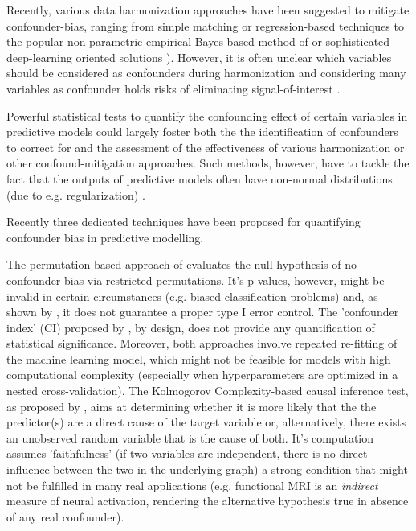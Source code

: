 \documentclass{article}
\theoremstyle{definition}
\begin{document}
Recently, various data harmonization approaches have been suggested to mitigate confounder-bias, ranging from simple matching \citep{rao2017predictive} or regression-based techniques \citep{rao2017predictive, dukart2011age, spisak2014voxel, abdulkadir2014reduction} to the popular non-parametric empirical Bayes-based method of \cite{johnson2007adjusting} or sophisticated deep-learning oriented solutions \citep{zhao2020training, hognon2019standardization}). However, it is often unclear which variables should be considered as confounders during harmonization and considering many variables as confounder holds risks of eliminating signal-of-interest \citep{wachinger2021detect}.

Powerful statistical tests to quantify the confounding effect of certain variables in predictive models could largely foster both the the identification of confounders to correct for and the assessment of the effectiveness of various harmonization or other confound-mitigation approaches. Such methods, however, have to tackle the fact that the outputs of predictive models often have non-normal distributions (due to e.g. regularization) \citep{garcia2009study, kristensen2017whole}.

Recently three dedicated techniques \citep{chaibub2019permutation, ferrari2020measuring, wachinger2021detect} have been proposed for quantifying confounder bias in predictive modelling.

The permutation-based approach of \cite{chaibub2019permutation} evaluates the null-hypothesis of no confounder bias via restricted permutations. It's p-values, however, might be invalid in certain circumstances (e.g. biased classification problems) and, as shown by \cite{ferrari2020measuring}, it does not guarantee a proper type I error control.
The 'confounder index' (CI) proposed by \cite{ferrari2020measuring}, by design, does not provide any quantification of statistical significance.
Moreover, both approaches involve repeated re-fitting of the machine learning model, which might not be feasible for models with high computational complexity (especially when hyperparameters are optimized in a nested cross-validation).
The Kolmogorov Complexity-based causal inference test, as proposed by \cite{wachinger2021detect}, aims at determining whether it is more likely that the the predictor(s) are a direct cause of the target variable or, alternatively, there exists an unobserved random variable that is the cause of both. It's computation assumes 'faithfulness' (if two variables are independent, there is no direct influence between the two in the underlying graph) a strong condition that might not be fulfilled in many real applications (e.g. functional MRI is an \emph{indirect} measure of neural activation, rendering the alternative hypothesis true in absence of any real confounder).
\end{document}
